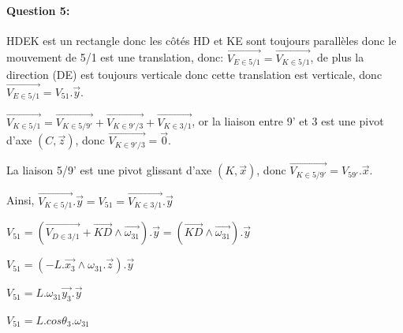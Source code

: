 \paragraph{Question 5:}

HDEK est un rectangle donc les côtés HD et KE sont toujours parallèles donc le mouvement de 5/1 est une translation, donc: $\overrightarrow{V_{E\in5/1}}=\overrightarrow{V_{K\in5/1}}$, de plus la direction (DE) est toujours verticale donc cette translation est verticale, donc $\overrightarrow{V_{E\in5/1}}=V_{51}.\overrightarrow{y}$.

$\overrightarrow{V_{K\in5/1}}=\overrightarrow{V_{K\in5/9'}}+\overrightarrow{V_{K\in9'/3}}+\overrightarrow{V_{K\in3/1}}$, or la liaison entre 9' et 3 est une pivot d'axe $(C,\overrightarrow{z})$, donc $\overrightarrow{V_{K\in9'/3}}=\overrightarrow{0}$.

La liaison 5/9' est une pivot glissant d'axe $(K,\overrightarrow{x})$, donc $\overrightarrow{V_{K\in5/9'}}=V_{59'}.\overrightarrow{x}$.

Ainsi, $\overrightarrow{V_{K\in5/1}}.\overrightarrow{y}=V_{51}=\overrightarrow{V_{K\in3/1}}.\overrightarrow{y}$

$V_{51}=(\overrightarrow{V_{D\in3/1}}+\overrightarrow{KD}\wedge \overrightarrow{\omega_{31}}).\overrightarrow{y}=(\overrightarrow{KD}\wedge \overrightarrow{\omega_{31}}).\overrightarrow{y}$

$V_{51}=(-L.\overrightarrow{x_3}\wedge \omega_{31}.\overrightarrow{z}).\overrightarrow{y}$

$V_{51}=L.\omega_{31}\overrightarrow{y_3}.\overrightarrow{y}$

$V_{51}=L.cos\theta_3.\omega_{31}$



